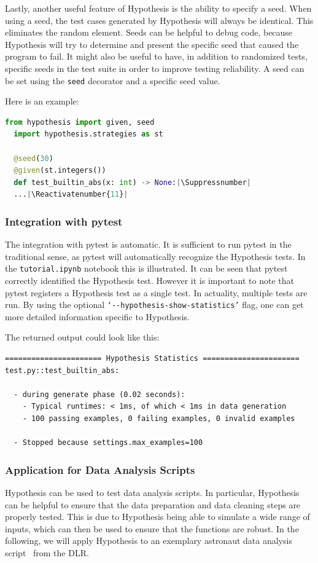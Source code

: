 \documentclass[runningheads]{llncs}
\makeatletter
\let\origthelstnumber\thelstnumber
\newcommand*\Suppressnumber{%
  \lst@AddToHook{OnNewLine}{%
    \let\thelstnumber\relax%
     \advance\c@lstnumber-\@ne\relax%
    }%
}
\newcommand*\Reactivatenumber[1]{%
  \setcounter{lstnumber}{\numexpr#1-1\relax}
  \lst@AddToHook{OnNewLine}{%
   \let\thelstnumber\origthelstnumber%
   \refstepcounter{lstnumber}%
  }%
}
\makeatother
\begin{document}
\noindent Lastly, another useful feature of Hypothesis is the ability to specify a seed. When using a seed, the test cases generated by Hypothesis will always be identical. This eliminates the random element. Seeds can be helpful to debug code, because Hypothesis will try to determine and present the specific seed that caused the program to fail. It might also be useful to have, in addition to randomized tests, specific seeds in the test suite in order to improve testing reliability. A seed can be set using the \texttt{seed} decorator and a specific seed value.

\newpage
\noindent Here is an example:
\begin{lstlisting}[language=Python,caption={Specifying Seeds from code/tutorial.ipynb}]
  from hypothesis import given, seed
  import hypothesis.strategies as st

  @seed(30)
  @given(st.integers())
  def test_builtin_abs(x: int) -> None:|\Suppressnumber|
  ...|\Reactivatenumber{11}|

\end{lstlisting}

\subsubsection{Integration with pytest}
The integration with pytest is automatic. It is sufficient to run pytest in the traditional sense, as pytest will automatically recognize the Hypothesis tests. In the \texttt{tutorial.ipynb} notebook this is illustrated. It can be seen that pytest correctly identified the Hypothesis test. However it is important to note that pytest registers a Hypothesis test as a single test. In actuality, multiple tests are run. By using the optional \texttt{`-{}-hypothesis-show-statistics'} flag, one can get more detailed information specific to Hypothesis.

\vspace{5mm}
\noindent The returned output could look like this:
\begin{verbatim}
====================== Hypothesis Statistics ======================
test.py::test_builtin_abs:

  - during generate phase (0.02 seconds):
    - Typical runtimes: < 1ms, of which < 1ms in data generation
    - 100 passing examples, 0 failing examples, 0 invalid examples

  - Stopped because settings.max_examples=100
\end{verbatim}

\subsubsection{Application for Data Analysis Scripts}
Hypothesis can be used to test data analysis scripts. In particular, Hypothesis can be helpful to ensure that the data preparation and data cleaning steps are properly tested. This is due to Hypothesis being able to simulate a wide range of inputs, which can then be used to ensure that the functions are robust. In the following, we will apply Hypothesis to an exemplary astronaut data analysis script~\cite{Stoffers2021} from the DLR.
\end{document}
